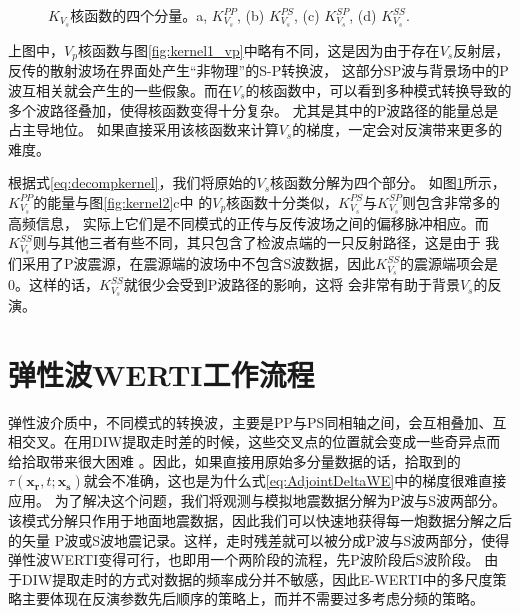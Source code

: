 \begin{figure}[!htb]
   \caption{$K_{V_s}$核函数的四个分量。a, $K_{V_s}^{PP}$, (b) $K_{V_s}^{PS}$, (c) $K_{V_s}^{SP}$, (d) $K_{V_s}^{SS}$.}
   \label{fig:kernel2_vs_decomp}
\end{figure}
上图中，$V_p$核函数与图\ref{fig:kernel1_vp}中略有不同，这是因为由于存在$V_s$反射层，反传的散射波场在界面处产生“非物理”的S-P转换波，
这部分SP波与背景场中的P波互相关就会产生的一些假象。而在$V_s$的核函数中，可以看到多种模式转换导致的多个波路径叠加，使得核函数变得十分复杂。
尤其是其中的P波路径的能量总是占主导地位。
如果直接采用该核函数来计算$V_s$的梯度，一定会对反演带来更多的难度。

根据式\ref{eq:decompkernel}，我们将原始的$V_s$核函数分解为四个部分。
如图\ref{fig:kernel2_vs_decomp}所示，$K_{V_s}^{PP}$的能量与图\ref{fig:kernel2}c中
的$V_p$核函数十分类似，$K_{V_s}^{PS}$与$K_{V_s}^{SP}$则包含非常多的高频信息，
实际上它们是不同模式的正传与反传波场之间的偏移脉冲相应。而$K_{V_s}^{SS}$则与其他三者有些不同，其只包含了检波点端的一只反射路径，这是由于
我们采用了P波震源，在震源端的波场中不包含S波数据，因此$K_{V_s}^{SS}$的震源端项会是0。这样的话，$K_{V_s}^{SS}$就很少会受到P波路径的影响，这将
会非常有助于背景$V_s$的反演。
\section{弹性波WERTI工作流程}
弹性波介质中，不同模式的转换波，主要是PP与PS同相轴之间，会互相叠加、互相交叉。在用DIW提取走时差的时候，这些交叉点的位置就会变成一些奇异点而给拾取带来很大困难
。因此，如果直接用原始多分量数据的话，拾取到的$\tau(\mathbf{x_r},t;\mathbf{x_s})$就会不准确，这也是为什么式\eqref{eq:AdjointDeltaWE}中的梯度很难直接应用。
为了解决这个问题，我们将观测与模拟地震数据分解为P波与S波两部分。该模式分解只作用于地面地震数据\cite[]{Li2016a}，因此我们可以快速地获得每一炮数据分解之后的矢量
P波或S波地震记录。这样，走时残差就可以被分成P波与S波两部分，使得弹性波WERTI变得可行，也即用一个两阶段的流程，先P波阶段后S波阶段。
由于DIW提取走时的方式对数据的频率成分并不敏感，因此E-WERTI中的多尺度策略主要体现在反演参数先后顺序的策略上，而并不需要过多考虑分频的策略。
